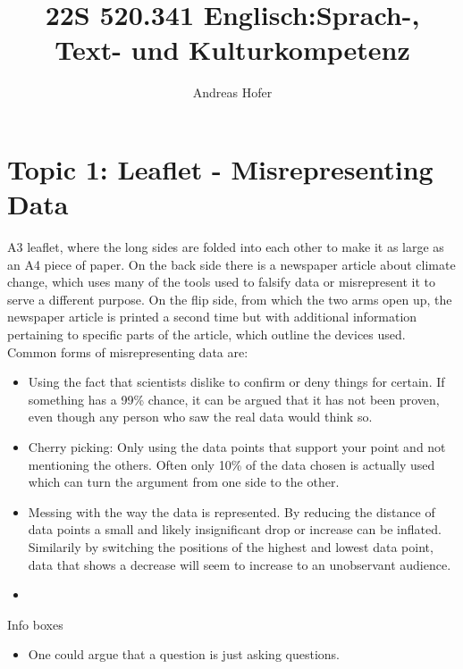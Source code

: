 \documentclass{article}
\title{\vspace{-3cm}22S 520.341 Englisch:Sprach-, Text- und Kulturkompetenz}
\author{Andreas Hofer}
\begin{document}
	\section*{Topic 1: Leaflet - Misrepresenting Data}
	A3 leaflet, where the long sides are folded into each other to make it as large as an A4 piece of paper. On the back side there is a newspaper article about climate change, which uses many of the tools used to falsify data or misrepresent it to serve a different purpose. On the flip side, from which the two arms open up, the newspaper article is printed a second time but with additional information pertaining to specific parts of the article, which outline the devices used. Common forms of misrepresenting data are:
	\begin{itemize}
		\item{Using the fact that scientists dislike to confirm or deny things for certain. If something has a 99\% chance, it can be argued that it has not been proven, even though any person who saw the real data would think so.}
		\item{Cherry picking: Only using the data points that support your point and not mentioning the others. Often only 10\% of the data chosen is actually used which can turn the argument from one side to the other.}
		\item{Messing with the way the data is represented. By reducing the distance of data points a small and likely insignificant drop or increase can be inflated. Similarily by switching the positions of the highest and lowest data point, data that shows a decrease will seem to increase to an unobservant audience.}
		\item{}
	\end{itemize}
	Info boxes
	\begin{itemize}
		\item{One could argue that a question is just asking questions.}
	\end{itemize}
	
\end{document}
